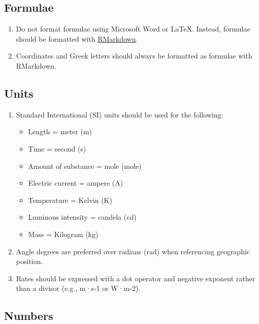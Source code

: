 \documentclass[
]{book}
\providecommand{\tightlist}{%
  \setlength{\itemsep}{0pt}\setlength{\parskip}{0pt}}
\begin{document}
\hypertarget{formulae}{%
\subsection{Formulae}\label{formulae}}

\begin{enumerate}
\def\labelenumi{\arabic{enumi}.}
\tightlist
\item
  Do not format formulae using Microsoft Word or LaTeX. Instead, formulae should be formatted with \href{https://bookdown.org/yihui/rmarkdown/markdown-syntax.html}{RMarkdown}.
\item
  Coordinates and Greek letters should always be formatted as formulae with RMarkdown.
\end{enumerate}

\hypertarget{units}{%
\subsection{Units}\label{units}}

\begin{enumerate}
\def\labelenumi{\arabic{enumi}.}
\tightlist
\item
  Standard International (SI) units should be used for the following:

  \begin{itemize}
  \tightlist
  \item
    Length = meter (m)
  \item
    Time = second (s)
  \item
    Amount of substance = mole (mole)
  \item
    Electric current = ampere (A)
  \item
    Temperature = Kelvin (K)
  \item
    Luminous intensity = candela (cd)
  \item
    Mass = Kilogram (kg)
  \end{itemize}
\item
  Angle degrees are preferred over radians (rad) when referencing geographic position.
\item
  Rates should be expressed with a dot operator and negative exponent rather than a divisor (e.g., m·s-1 or W·m-2).
\end{enumerate}

\hypertarget{numbers}{%
\subsection{Numbers}\label{numbers}}
\end{document}
